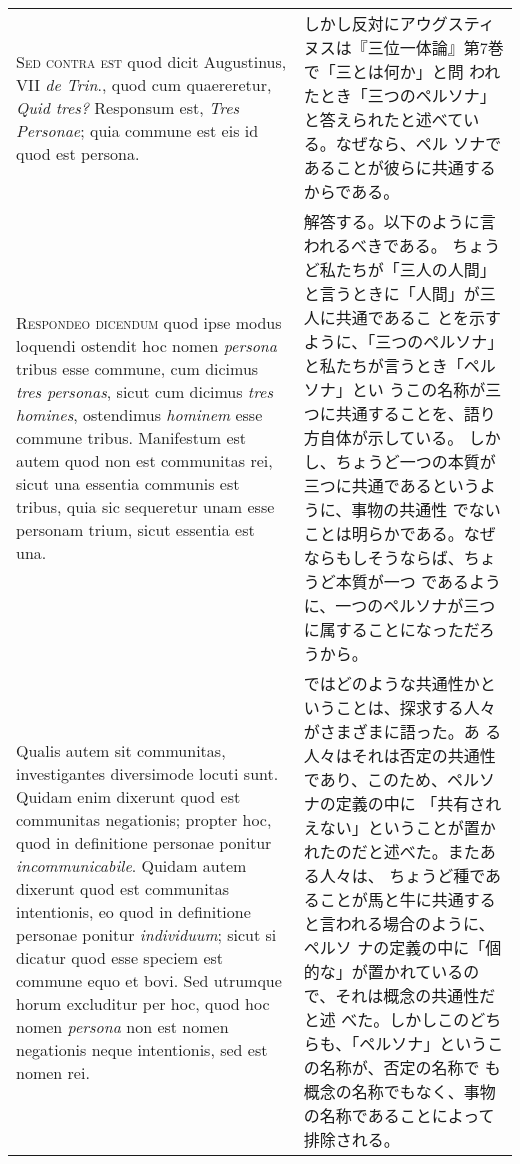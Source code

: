 \documentclass[10pt]{jsarticle} %
\begin{document}
\begin{longtable}{p{21em}p{21em}}
\\



{\scshape Sed contra est} quod dicit Augustinus, VII {\itshape de Trin}., quod cum
quaereretur, {\itshape Quid tres?} Responsum est, {\itshape Tres Personae}; quia commune est
eis id quod est persona.

&

しかし反対にアウグスティヌスは『三位一体論』第7巻で「三とは何か」と問
 われたとき「三つのペルソナ」と答えられたと述べている。なぜなら、ペル
 ソナであることが彼らに共通するからである。


\\



{\scshape Respondeo dicendum} quod ipse modus loquendi ostendit hoc nomen {\itshape persona}
tribus esse commune, cum dicimus {\itshape tres personas}, sicut cum dicimus {\itshape tres
homines}, ostendimus {\itshape hominem} esse commune tribus. Manifestum est autem
quod non est communitas rei, sicut una essentia communis est tribus,
quia sic sequeretur unam esse personam trium, sicut essentia est
una. 


&

解答する。以下のように言われるべきである。
ちょうど私たちが「三人の人間」と言うときに「人間」が三人に共通であるこ
 とを示すように、「三つのペルソナ」と私たちが言うとき「ペルソナ」とい
 うこの名称が三つに共通することを、語り方自体が示している。
しかし、ちょうど一つの本質が三つに共通であるというように、事物の共通性
 でないことは明らかである。なぜならもしそうならば、ちょうど本質が一つ
 であるように、一つのペルソナが三つに属することになっただろうから。


\\

Qualis autem sit communitas, investigantes diversimode locuti
sunt. Quidam enim dixerunt quod est communitas negationis; propter
hoc, quod in definitione personae ponitur {\itshape incommunicabile}. Quidam
autem dixerunt quod est communitas intentionis, eo quod in definitione
personae ponitur {\itshape individuum}; sicut si dicatur quod esse speciem est
commune equo et bovi. Sed utrumque horum excluditur per hoc, quod hoc
nomen {\itshape persona} non est nomen negationis neque intentionis, sed est
nomen rei. 


&

ではどのような共通性かということは、探求する人々がさまざまに語った。あ
 る人々はそれは否定の共通性であり、このため、ペルソナの定義の中に
 「共有されえない」ということが置かれたのだと述べた。またある人々は、
 ちょうど種であることが馬と牛に共通すると言われる場合のように、ペルソ
 ナの定義の中に「個的な」が置かれているので、それは概念の共通性だと述
 べた。しかしこのどちらも、「ペルソナ」というこの名称が、否定の名称で
 も概念の名称でもなく、事物の名称であることによって排除される。




\end{longtable}
\end{document}
